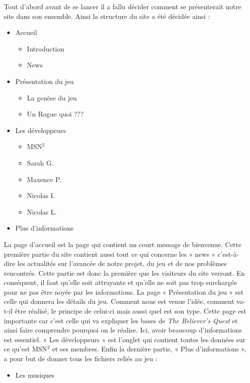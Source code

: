 \documentclass[]{extarticle}
\begin{document}
\begin{spacing}{1.25}
\bigbreak
\bigbreak
Tout d’abord avant de se lancer il a fallu décider comment se présenterait notre site dans son ensemble. Ainsi la structure du site a été décidée ainsi :
\bigbreak
\begin{itemize}
\item Accueil
\begin{itemize}
\item Introduction
\item News
\end{itemize}
\bigbreak
\item Présentation du jeu
\begin{itemize}
\item La genèse du jeu
\item Un Rogue quoi ???
\end{itemize}
\bigbreak
\item Les développeurs
\begin{itemize}
\item MSN$^2$
\item Sarah G.
\item Maxence P.
\item Nicolas I.
\item Nicolas L.
\end{itemize}
\bigbreak
\item Plus d'informations
\end{itemize}
\bigbreak
\bigbreak
La page d’accueil est la page qui contient un court message de bienvenue. Cette première partie du site contient aussi tout ce qui concerne les « news » c’est-à-dire les actualités sur l’avancée de notre projet, du jeu et de nos problèmes rencontrés. Cette partie est donc la première que les visiteurs du site verront. En conséquent, il faut qu'elle soit attrayante et qu’elle ne soit pas trop surchargée pour ne pas être noyée par les informations.
\bigbreak
La page « Présentation du jeu » est celle qui donnera les détails du jeu. Comment nous est venue l'idée, comment va-t-il être réalisé, le principe de celui-ci mais aussi quel est son type. Cette page est importante car c’est celle qui va expliquer les bases de \textit{The Believer's Quest} et ainsi faire comprendre pourquoi on le réalise. Ici, avoir beaucoup d’informations est essentiel.
\bigbreak
« Les développeurs » est l’onglet qui contient toutes les données sur ce qu’est MSN$^2$ et ses membres.
\newpage
Enfin la dernière partie, « Plus d'informations », a pour but de donner tous les fichiers reliés au jeu :
\bigbreak
\begin{itemize}
\item Les musiques

\end{itemize}
\end{spacing}
\end{document}
